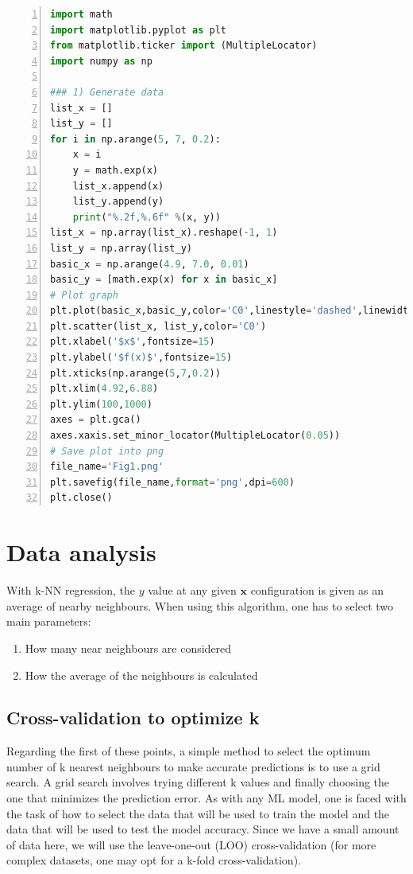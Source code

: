 \documentclass{article}%
\begin{document}
\begin{lstlisting}[language=Python, caption=Code1,backgroundcolor=\color{lightgrey},keywordstyle=\color{darkgreen},commentstyle=\color{red},
showspaces=false,numbers=left,stringstyle=\color{purple}]
import math
import matplotlib.pyplot as plt 
from matplotlib.ticker import (MultipleLocator)
import numpy as np

### 1) Generate data
list_x = []
list_y = []
for i in np.arange(5, 7, 0.2):
    x = i 
    y = math.exp(x)
    list_x.append(x)
    list_y.append(y)
    print("%.2f,%.6f" %(x, y)) 
list_x = np.array(list_x).reshape(-1, 1)
list_y = np.array(list_y)
basic_x = np.arange(4.9, 7.0, 0.01)
basic_y = [math.exp(x) for x in basic_x]
# Plot graph
plt.plot(basic_x,basic_y,color='C0',linestyle='dashed',linewidth=1)
plt.scatter(list_x, list_y,color='C0')
plt.xlabel('$x$',fontsize=15)
plt.ylabel('$f(x)$',fontsize=15)
plt.xticks(np.arange(5,7,0.2))
plt.xlim(4.92,6.88)
plt.ylim(100,1000)
axes = plt.gca()
axes.xaxis.set_minor_locator(MultipleLocator(0.05))
# Save plot into png
file_name='Fig1.png'
plt.savefig(file_name,format='png',dpi=600)
plt.close()
\end{lstlisting}


\section{Data analysis}
With k-NN regression, the $y$ value at any given $\mathbf{x}$ configuration is given as an average of nearby neighbours. When using this algorithm, one has to select two main parameters:
\begin{enumerate}
	\item How many near neighbours are considered
	\item How the average of the neighbours is calculated
\end{enumerate}

\subsection{Cross-validation to optimize k}
Regarding the first of these points, a simple method to select the optimum number of k nearest neighbours to make accurate predictions is to use a grid search. A grid search involves trying different k values and finally choosing the one that minimizes the prediction error. As with any ML model, one is faced with the task of how to select the data that will be used to train the model and the data that will be used to test the model accuracy. Since we have a small amount of data here, we will use the leave-one-out (LOO) cross-validation (for more complex datasets, one may opt for a k-fold cross-validation).
\end{document}
